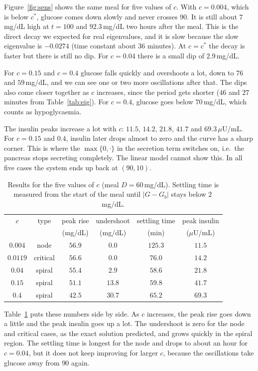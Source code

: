 \documentclass[11pt,a4paper]{article}
\newcommand{\Gb}{G_b}
\newcommand{\cs}{c^{*}}
\begin{document}
Figure~\ref{fig:sens} shows the same meal for five values of $c$. With $c=0.004$, which is below $\cs$, glucose comes down slowly and never crosses $90$. It is still about $7$\,mg/dL high at $t=100$ and $92.3$\,mg/dL two hours after the meal. This is the direct decay we expected for real eigenvalues, and it is slow because the slow eigenvalue is $-0.0274$ (time constant about $36$ minutes). At $c=\cs$ the decay is faster but there is still no dip. For $c=0.04$ there is a small dip of $2.9$\,mg/dL.

For $c=0.15$ and $c=0.4$ glucose falls quickly and overshoots a lot, down to $76$ and $59$\,mg/dL, and we can see one or two more oscillations after that. The dips also come closer together as $c$ increases, since the period gets shorter ($46$ and $27$ minutes from Table~\ref{tab:eig}). For $c=0.4$, glucose goes below $70$\,mg/dL, which counts as hypoglycaemia.

The insulin peaks increase a lot with $c$: $11.5$, $14.2$, $21.8$, $41.7$ and $69.3$\,$\mu$U/mL. For $c=0.15$ and $0.4$, insulin later drops almost to zero and the curve has a sharp corner. This is where the $\max\{0,\cdot\}$ in the secretion term switches on, i.e.\ the pancreas stops secreting completely. The linear model cannot show this. In all five cases the system ends up back at $(90,10)$.

\begin{table}[H]
\centering
\caption{Results for the five values of $c$ (meal $D=60$\,mg/dL). Settling time is measured from the start of the meal until $|G-\Gb|$ stays below $2$\,mg/dL.}
\label{tab:metrics}
\begin{tabular}{cccccc}
\toprule
$c$ & type & peak rise & undershoot & settling time & peak insulin\\
 & & (mg/dL) & (mg/dL) & (min) & ($\mu$U/mL)\\
\midrule
$0.004$ & node & $56.9$ & $0.0$ & $125.3$ & $11.5$\\
$0.0119$ & critical & $56.6$ & $0.0$ & $76.0$ & $14.2$\\
$0.04$ & spiral & $55.4$ & $2.9$ & $58.6$ & $21.8$\\
$0.15$ & spiral & $51.1$ & $13.8$ & $59.8$ & $41.7$\\
$0.4$ & spiral & $42.5$ & $30.7$ & $65.2$ & $69.3$\\
\bottomrule
\end{tabular}
\end{table}

Table~\ref{tab:metrics} puts these numbers side by side. As $c$ increases, the peak rise goes down a little and the peak insulin goes up a lot. The undershoot is zero for the node and critical cases, as the exact solution predicted, and grows quickly in the spiral region. The settling time is longest for the node and drops to about an hour for $c=0.04$, but it does not keep improving for larger $c$, because the oscillations take glucose away from $90$ again.
\end{document}
